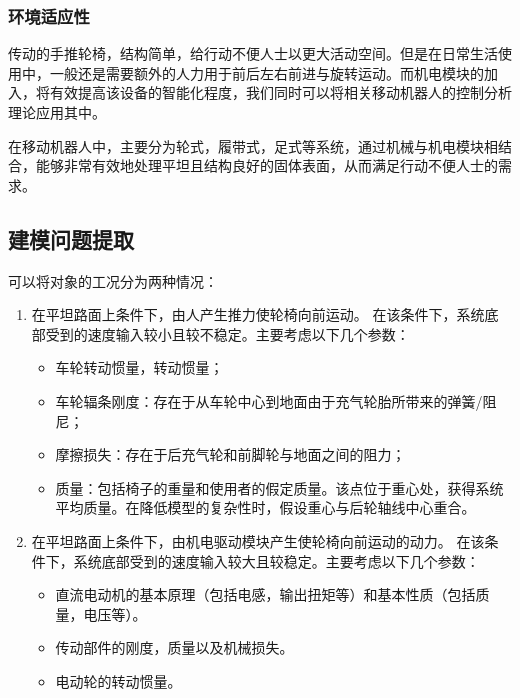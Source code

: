 \subsubsection{环境适应性}

传动的手推轮椅，结构简单，给行动不便人士以更大活动空间。但是在日常生活使用中，一般还是需要额外的人力用于前后左右前进与旋转运动。而机电模块的加入，将有效提高该设备的智能化程度，我们同时可以将相关移动机器人的控制分析理论应用其中。

在移动机器人中，主要分为轮式，履带式，足式等系统，通过机械与机电模块相结合，能够非常有效地处理平坦且结构良好的固体表面，从而满足行动不便人士的需求。

\subsection{建模问题提取}

可以将对象的工况分为两种情况：

\begin{enumerate}
	\item 在平坦路面上条件下，由人产生推力使轮椅向前运动。
	在该条件下，系统底部受到的速度输入较小且较不稳定。主要考虑以下几个参数：
	\begin{itemize}
		\item 车轮转动惯量，转动惯量；
		
		\item 车轮辐条刚度：存在于从车轮中心到地面由于充气轮胎所带来的弹簧/阻尼；
		
		\item 摩擦损失：存在于后充气轮和前脚轮与地面之间的阻力；
		
		\item 质量：包括椅子的重量和使用者的假定质量。该点位于重心处，获得系统平均质量。在降低模型的复杂性时，假设重心与后轮轴线中心重合。
	\end{itemize}
	
	\item 在平坦路面上条件下，由机电驱动模块产生使轮椅向前运动的动力。
	在该条件下，系统底部受到的速度输入较大且较稳定。主要考虑以下几个参数：
	\begin{itemize}
		\item 直流电动机的基本原理（包括电感，输出扭矩等）和基本性质（包括质量，电压等）。
		
		\item 传动部件的刚度，质量以及机械损失。
		
		\item 电动轮的转动惯量。
	\end{itemize}
	
\end{enumerate}

